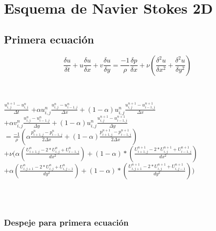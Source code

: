 \documentclass[a4paper]{article}
\begin{document}
\newpage
\section{Esquema de Navier Stokes 2D}
\subsection{Primera ecuación}


$$ \frac{\delta u}{\delta t} + u \frac{\delta u}{\delta x} + v \frac{\delta u}{\delta y} =  \frac{-1}{\rho} \frac{\delta p}{\delta x} + \nu (\frac{{\delta}^{2} u}{\delta {x}^{2}} + \frac{{\delta}^{2} u}{\delta {y}^{2}}) $$

~\\
~\\

$ \frac{ {u}^{n+1}_{i,j} - u^{n}_{i,j}}{ \Delta t} $
$+ \alpha {u}^{n}_{i,j} \frac{ {u}^{n}_{i,j} - u^{n}_{i-1,j}}{ \Delta x} + (1 - \alpha) {u}^{n}_{i,j} \frac{ {u}^{n+1}_{i,j} - u^{n+1}_{i-1,j}}{ \Delta x}$ 
\\
$+ \alpha {v}^{n}_{i,j} \frac{ {u}^{n}_{i,j} - u^{n}_{i-1,j}}{ \Delta y} + (1 - \alpha) {u}^{n}_{i,j} \frac{ {u}^{n+1}_{i,j} - u^{n+1}_{i-1,j}}{ \Delta y}$
\\
$= \frac{-1}{\rho} ( \alpha \frac{p^{n}_{i+1,j} - p^{n}_{i-1,j} }{ 2 \Delta x } + (1 - \alpha) \frac{p^{n+1}_{i+1,j} - p^{n+1}_{i-1,j} }{ 2 \Delta x })  $
\\
$+ \nu (\alpha (\frac{ U^{n}_{i+1,j} - 2*U^{n}_{i,j} + U^{n}_{i-1,j}}{dx^2}) + (1-\alpha)*(\frac{ U^{n+1}_{i+1,j} - 2*U^{n+1}_{i,j} + U^{n+1}_{i-1,j}}{dx^2})$
\\
$+ \alpha (\frac{ U^{n}_{i,j+1} - 2*U^{n}_{i,j} + U^{n}_{i,j-1}}{dy^2}) + (1-\alpha)*(\frac{ U^{n+1}_{i,j+1} - 2*U^{n+1}_{i,j} + U^{n+1}_{i,j-1}}{dy^2}))$


~\\
~\\

\subsubsection{Despeje para primera ecuación}
\end{document}
